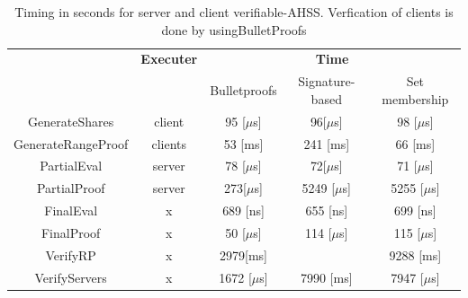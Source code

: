\begin{table}
\caption{Timing in seconds for server and client verifiable-AHSS. Verfication of clients is done by usingBulletProofs}
\centering
\begin{tabular}{*{5}{c}}
\label{tab:BenchBP}
\hline
    										&  \textbf{Executer}   & \multicolumn{3}{c}{\textbf{Time}}   		\\ 
    										& 								& Bulletproofs  & Signature-based & Set membership \\	\hline
  GenerateShares 				&  client  					&   95 [$\mu$s]			 &96[$\mu$s]  &98 [$\mu$s]												\\ \hline 
  GenerateRangeProof  		&  clients  					&   53 [ms]				& 	241 [ms]	&66 [ms]			\\ \hline 
  PartialEval  						&  server  					&   78	[$\mu$s]				&72[$\mu$s]	 		&	71	 [$\mu$s]							\\ \hline 
  PartialProof 					&  server 					&   273[$\mu$s]						& 5249 [$\mu$s]			& 5255 [$\mu$s]				\\ \hline 
  FinalEval  						&  x  							&   689 [ns]						&655  [ns]				&			699  [ns]												\\ \hline 
  FinalProof  						&  x 							&   50	[$\mu$s]			&  114 [$\mu$s]	&				115 [$\mu$s]									\\ \hline 
  VerifyRP							&  x 							&   2979[ms]					&  &					9288 [ms]							\\ \hline 
  VerifyServers					&  x 							&   1672 [$\mu$s]					&		7990 [ms] 	&		7947 [$\mu$s]					\\ \hline 
\end{tabular}
\end{table}
 

